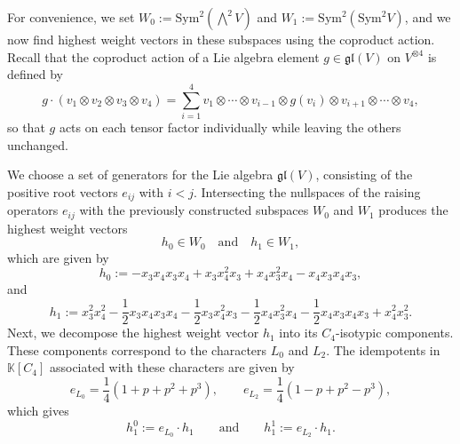 \documentclass{amsart}
\begin{document}
For convenience, we set $W_0 := \mathrm{Sym}^2(\bigwedge^2 V)$ and $W_1 := \mathrm{Sym}^2(\mathrm{Sym}^2 V)$, and we now find highest weight vectors in these subspaces using the coproduct action. Recall that the coproduct action of a Lie algebra element $g \in \mathfrak{gl}(V)$ on $V^{\otimes 4}$ is defined by
\[
g \cdot (v_1 \otimes v_2 \otimes v_3 \otimes v_4) 
= \sum_{i=1}^{4} v_1 \otimes \cdots \otimes v_{i-1} \otimes g(v_i) \otimes v_{i+1} \otimes \cdots \otimes v_4,
\]
so that $g$ acts on each tensor factor individually while leaving the others unchanged.

We choose a set of generators for the Lie algebra $\mathfrak{gl}(V)$, consisting of the positive root vectors $e_{ij}$ with $i < j$.  
Intersecting the nullspaces of the raising operators $e_{ij}$ with the previously constructed subspaces $W_0$ and $W_1$ produces the highest weight vectors 
\[
h_{0} \in W_0 \quad \text{and} \quad h_{1} \in W_1, 
\]
which are given by 
$$h_0 := -x_3x_4x_3x_4 + x_3x_4^{2}x_3 + x_4x_3^{2}x_4 - x_4x_3x_4x_3,$$ and 
$$ h_1:= x_3^2 x_4^2
- \frac{1}{2} x_3 x_4 x_3 x_4
- \frac{1}{2} x_3 x_4^2 x_3
- \frac{1}{2} x_4 x_3^2 x_4
- \frac{1}{2} x_4 x_3 x_4 x_3
+ x_4^2 x_3^2.$$
Next, we decompose the highest weight vector $h_1$ into its $C_4$-isotypic components. These components correspond to the characters $L_0$ and $L_2$. The idempotents in $\mathbb{K}[C_4]$ associated with these characters are given by
\[
e_{L_0} = \frac{1}{4}(1 + p + p^2 + p^3), 
\qquad
e_{L_2} = \frac{1}{4}(1 - p + p^2 - p^3),
\]
which gives
\[
h_1^0 := e_{L_0} \cdot h_1
\qquad \text{and} \qquad 
h_1^1 := e_{L_2} \cdot h_1.
\]
\end{document}
